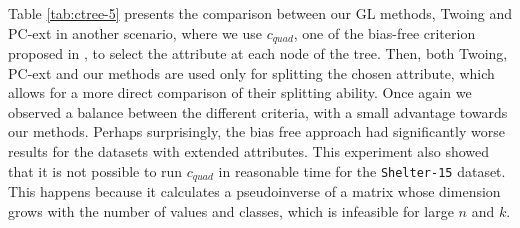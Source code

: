Table \ref{tab:ctree-5} presents the 
comparison between our GL methods, Twoing and PC-ext in another scenario,
where we use $c_{quad}$, one of the bias-free criterion proposed in \cite{Hothorn:2006:URP}, to select the attribute at each node of the tree. 
Then, both Twoing, PC-ext and our methods are  used only for splitting the chosen attribute,  which allows for a  more direct comparison of their splitting ability. Once again we observed a balance between the different criteria, with a small advantage towards our methods. Perhaps surprisingly, the bias free approach had significantly worse results for the datasets with extended attributes. This experiment also showed that it is not possible to run $c_{quad}$ in reasonable time for the {\tt Shelter-15} dataset. This happens because it calculates a pseudoinverse of a matrix whose dimension grows with the number of values and classes, which is infeasible for large $n$ and $k$.


